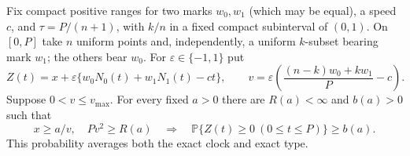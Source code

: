 \begin{lemma}
\label{bridge:continuation}
Fix compact positive ranges for two marks $w_0,w_1$ (which may be equal),
a speed $c$, and $\tau=P/(n+1)$, with $k/n$ in a fixed compact
subinterval of $(0,1)$. On $[0,P]$ take $n$ uniform points and,
independently, a uniform $k$-subset bearing mark $w_1$; the others bear
$w_0$. For $\varepsilon\in\{-1,1\}$ put
\[
 Z(t)=x+\varepsilon\{w_0N_0(t)+w_1N_1(t)-ct\},\qquad
 v=\varepsilon\left(\frac{(n-k)w_0+kw_1}{P}-c\right).
\]
Suppose $0<v\le v_{\max}$. For every fixed $a>0$ there are
$R(a)<\infty$ and $b(a)>0$ such that
\[
 x\ge a/v,\quad Pv^2\ge R(a)
 \quad\Longrightarrow\quad
 \mathbb P\{Z(t)\ge0\ (0\le t\le P)\}\ge b(a).
\]
This probability averages both the exact clock and exact type.
\end{lemma}
